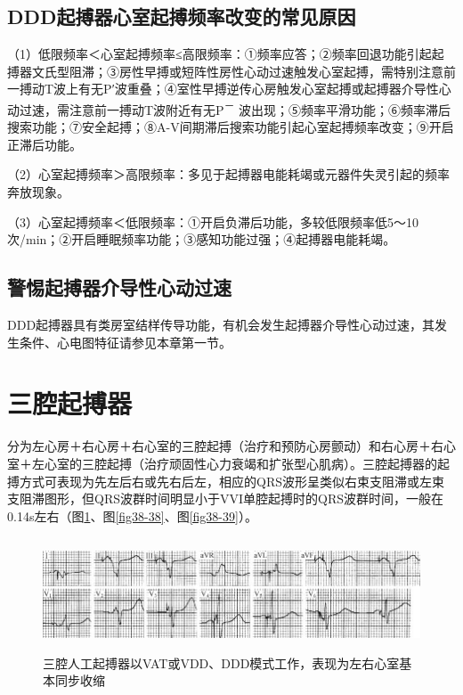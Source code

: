 \protect\hypertarget{text00045.htmlux5cux23subid500}{}{}

\subsection{DDD起搏器心室起搏频率改变的常见原因}

（1）低限频率＜心室起搏频率≤高限频率：①频率应答；②频率回退功能引起起搏器文氏型阻滞；③房性早搏或短阵性房性心动过速触发心室起搏，需特别注意前一搏动T波上有无P′波重叠；④室性早搏逆传心房触发心室起搏或起搏器介导性心动过速，需注意前一搏动T波附近有无P\textsuperscript{－}
波出现；⑤频率平滑功能；⑥频率滞后搜索功能；⑦安全起搏；⑧A-V间期滞后搜索功能引起心室起搏频率改变；⑨开启正滞后功能。

（2）心室起搏频率＞高限频率：多见于起搏器电能耗竭或元器件失灵引起的频率奔放现象。

（3）心室起搏频率＜低限频率：①开启负滞后功能，多较低限频率低5～10次/min；②开启睡眠频率功能；③感知功能过强；④起搏器电能耗竭。

\protect\hypertarget{text00045.htmlux5cux23subid501}{}{}

\subsection{警惕起搏器介导性心动过速}

DDD起搏器具有类房室结样传导功能，有机会发生起搏器介导性心动过速，其发生条件、心电图特征请参见本章第一节。

\protect\hypertarget{text00045.htmlux5cux23subid502}{}{}

\section{三腔起搏器}

分为左心房＋右心房＋右心室的三腔起搏（治疗和预防心房颤动）和右心房＋右心室＋左心室的三腔起搏（治疗顽固性心力衰竭和扩张型心肌病）。三腔起搏器的起搏方式可表现为先左后右或先右后左，相应的QRS波形呈类似右束支阻滞或左束支阻滞图形，但QRS波群时间明显小于VVI单腔起搏时的QRS波群时间，一般在0.14s左右（图\ref{fig38-37}、图\ref{fig38-38}、图\ref{fig38-39}）。

\begin{figure}[!htbp]
 \centering
 \includegraphics[width=5.78125in,height=1.32292in]{./images/Image00640.jpg}
 \captionsetup{justification=centering}
 \caption{三腔人工起搏器以VAT或VDD、DDD模式工作，表现为左右心室基本同步收缩}
 \label{fig38-37}
  \end{figure} 

